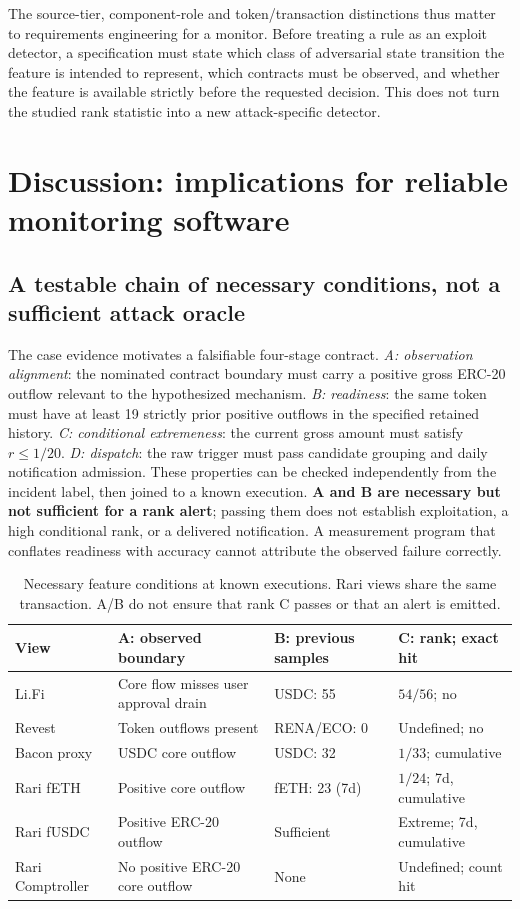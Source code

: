 \documentclass[preprint,12pt,authoryear]{elsarticle}
\begin{document}
The source-tier, component-role and token/transaction distinctions thus matter to requirements engineering for a monitor. Before treating a rule as an exploit detector, a specification must state which class of adversarial state transition the feature is intended to represent, which contracts must be observed, and whether the feature is available strictly before the requested decision. This does not turn the studied rank statistic into a new attack-specific detector.

\section{Discussion: implications for reliable monitoring software}\label{sec:discussion}

\subsection{A testable chain of necessary conditions, not a sufficient attack oracle}
The case evidence motivates a falsifiable four-stage contract. \emph{A: observation alignment}: the nominated contract boundary must carry a positive gross ERC-20 outflow relevant to the hypothesized mechanism. \emph{B: readiness}: the same token must have at least 19 strictly prior positive outflows in the specified retained history. \emph{C: conditional extremeness}: the current gross amount must satisfy $r\leq1/20$. \emph{D: dispatch}: the raw trigger must pass candidate grouping and daily notification admission. These properties can be checked independently from the incident label, then joined to a known execution. \textbf{A and B are necessary but not sufficient for a rank alert}; passing them does not establish exploitation, a high conditional rank, or a delivered notification. A measurement program that conflates readiness with accuracy cannot attribute the observed failure correctly.

\begin{table}[htbp]
\centering\footnotesize
\caption{Necessary feature conditions at known executions. Rari views share the same transaction. A/B do not ensure that rank C passes or that an alert is emitted.}
\label{tab:abc}
\begin{tabularx}{\linewidth}{p{1.65cm} >{\raggedright\arraybackslash}X p{1.72cm} >{\raggedright\arraybackslash}X}
\toprule
View & A: observed boundary & B: previous samples & C: rank; exact hit \\
\midrule
Li.Fi & Core flow misses user approval drain & USDC: 55 & $54/56$; no \\
Revest & Token outflows present & RENA/ECO: 0 & Undefined; no \\
Bacon proxy & USDC core outflow & USDC: 32 & $1/33$; cumulative \\
Rari fETH & Positive core outflow & fETH: 23 (7d) & $1/24$; 7d, cumulative \\
Rari fUSDC & Positive ERC-20 outflow & Sufficient & Extreme; 7d, cumulative \\
Rari Comptroller & No positive ERC-20 core outflow & None & Undefined; count hit \\
\bottomrule
\end{tabularx}
\end{table}
\end{document}
